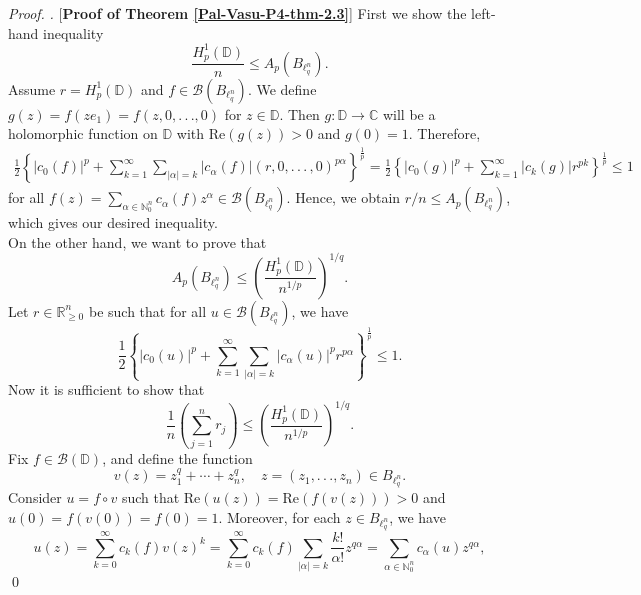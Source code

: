 \documentclass[a4paper,12pt]{amsart}
\theoremstyle{definition}
\newenvironment{pf}[1][]{%
 \vskip 3mm
 \noindent
 \ifthenelse{\equal{#1}{}}%
  {{\slshape Proof. }}%
  {{\slshape #1.} }%
 }%
{\qed\bigskip}
\begin{document}
\begin{pf} [{\bf Proof of Theorem \ref{Pal-Vasu-P4-thm-2.3}}]
	First we show the left-hand inequality
	\begin{equation*}
		\frac{H^1_p(\mathbb{D})}{n}\leq A_p\left(B_{\ell^n_q}\right).
	\end{equation*}
	Assume $r=H^1_p(\mathbb{D})$ and $f\in \mathcal{B}(B_{\ell^n_q})$. We define $g(z)=f(ze_1)=f(z,0,.\,.\,.,0)$ for $z\in \mathbb{D}.$ Then $g:\mathbb{D}\rightarrow\mathbb{C}$ will be a holomorphic function on $\mathbb{D}$ with $\mbox{Re}(g(z))>0$ and $g(0)=1$. Therefore,
	\begin{align*}
		\frac{1}{2}\left\{|c_0(f)|^p+\sum_{k=1}^{\infty}\sum_{|\alpha|=k}|c_{\alpha}(f)|(r,0,.\,.\,.\,,0)^{p\alpha}\right\}^{\frac{1}{p}}= \frac{1}{2}\left\{|c_0(g)|^p+\sum_{k=1}^{\infty}|c_{k}(g)|r^{pk}\right\}^{\frac{1}{p}}\leq 1
	\end{align*}
	for all $f(z)=\sum_{\alpha\in \mathbb{N}^n_{0}}c_{\alpha}(f)z^{\alpha} \in \mathcal{B}(B_{\ell^n_q})$. Hence, we obtain $r/n\leq A_p(B_{\ell^n_q})$, which gives our desired inequality.\\[2mm]
	On the other hand, we want to prove that 
	\begin{equation*}
		A_p\left(B_{\ell^n_q}\right)\leq \left(\frac{H^1_p(\mathbb{D})}{n^{1/p}}\right)^{1/q}.
	\end{equation*}
	Let $r\in \mathbb{R}^n_{\geq 0}$ be such that for all $u\in \mathcal{B}(B_{\ell^n_q})$, we have
	\begin{equation*}
		\frac{1}{2}\left\{|c_0(u)|^p + \sum_{k=1}^{\infty}\sum_{|\alpha|=k}|c_{\alpha}(u)|^pr^{p\alpha}\right\}^{\frac{1}{p}}\leq 1.
	\end{equation*}
	Now it is sufficient to show that
	\begin{equation}\label{Pal-Vasu-P4-e-3.5}
		\frac{1}{n}\left(\sum_{j=1}^{n}r_j\right) \leq  \left(\frac{H^1_p(\mathbb{D})}{n^{1/p}}\right)^{1/q}.
	\end{equation}
	Fix $f\in \mathcal{B}(\mathbb{D})$, and define the function
	\begin{equation*}
		v(z)=z^q_1+\cdots+z^q_n, \quad z=(z_1,.\,.\,.,z_n)\in B_{\ell^n_q}. 
	\end{equation*}
	 Consider $u=f\circ v$ such that $\mbox{Re}(u(z))=\mbox{Re}(f(v(z)))>0$ and $u(0)=f(v(0))=f(0)=1$. Moreover, for each $z\in B_{\ell^n_q}$, we have 
	\begin{equation*}
		u(z)=\sum_{k=0}^{\infty}c_{k}(f)v(z)^k=\sum_{k=0}^{\infty}c_k(f)\sum_{|\alpha|=k}\frac{k!}{\alpha!}z^{q\alpha}=\sum_{\alpha\in \mathbb{N}^n_{0}}c_{\alpha}(u)z^{q\alpha},

\end{equation*}
\end{pf}
\end{document}
